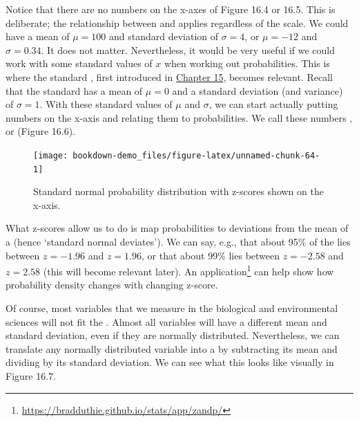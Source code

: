 \documentclass[
  openany]{krantz}
\begin{document}
Notice that there are no numbers on the x-axes of Figure 16.4 or 16.5.
This is deliberate; the relationship between  and  applies regardless of the scale.
We could have a mean of \(\mu = 100\) and standard deviation of \(\sigma = 4\), or \(\mu = -12\) and \(\sigma = 0.34\).
It does not matter.
Nevertheless, it would be very useful if we could work with some standard values of \(x\) when working out probabilities.
This is where the standard , first introduced in \protect\hyperlink{Chapter_15}{Chapter 15}, becomes relevant.
Recall that the standard  has a mean of \(\mu = 0\) and a standard deviation (and variance) of \(\sigma = 1\).
With these standard values of \(\mu\) and \(\sigma\), we can start actually putting numbers on the x-axis and relating them to probabilities.
We call these numbers \textbf{}, or \textbf{} (Figure 16.6).

\begin{figure}
\texttt{[image: bookdown-demo\_files/figure-latex/unnamed-chunk-64-1]} \caption{Standard normal probability distribution with z-scores shown on the x-axis.}\label{fig:unnamed-chunk-64}
\end{figure}

What z-scores allow us to do is map probabilities to deviations from the mean of a  (hence `standard normal deviates').
We can say, e.g., that about 95\% of the  lies between \(z = -1.96\) and \(z = 1.96\), or that about 99\% lies between \(z = -2.58\) and \(z = 2.58\) (this will become relevant later).
An  application\footnote{\url{https://bradduthie.github.io/stats/app/zandp/}} can help show how probability density changes with changing z-score.

\newpage

Of course, most variables that we measure in the biological and environmental sciences will not fit the .
Almost all variables will have a different mean and standard deviation, even if they are normally distributed.
Nevertheless, we can translate any normally distributed variable into a  by subtracting its mean and dividing by its standard deviation.
We can see what this looks like visually in Figure 16.7.
\end{document}
